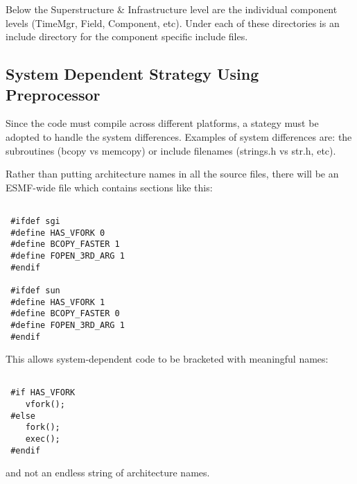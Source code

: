 Below the Superstructure \& Infrastructure level are the individual
component levels (TimeMgr, Field, Component, etc).  Under each of these
directories is an include directory for the component specific include
files.

\subsection{System Dependent Strategy Using Preprocessor} Since the code
must compile across different platforms, a stategy must be adopted to
handle the system differences. Examples of system differences are: the
subroutines (bcopy vs memcopy) or include filenames (strings.h vs str.h,
etc).

Rather than putting architecture names in all the source files, there will
be an ESMF-wide file which contains sections like this: 
\begin{verbatim}

 #ifdef sgi 
 #define HAS_VFORK 0 
 #define BCOPY_FASTER 1 
 #define FOPEN_3RD_ARG 1 
 #endif

 #ifdef sun 
 #define HAS_VFORK 1 
 #define BCOPY_FASTER 0 
 #define FOPEN_3RD_ARG 1 
 #endif

\end{verbatim} This allows system-dependent code to be bracketed with
meaningful names: 

\begin{verbatim} 

 #if HAS_VFORK
    vfork();
 #else
    fork(); 
    exec();
 #endif

\end{verbatim} 
and not an endless string of architecture names.


